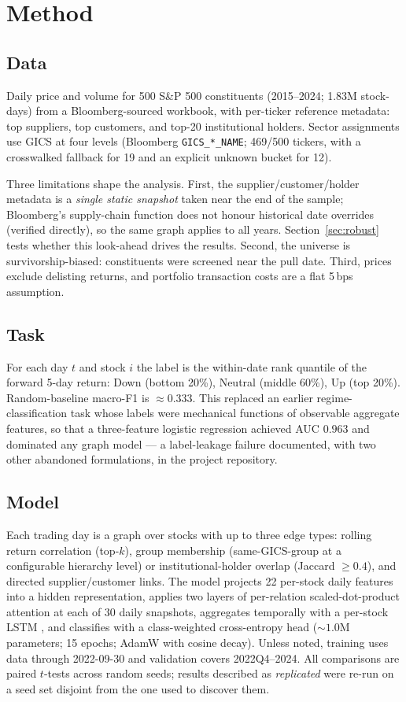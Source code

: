 \documentclass[11pt]{airesearch}
\begin{document}
\section{Method}

\subsection{Data}
Daily price and volume for 500 S\&P 500 constituents (2015--2024; 1.83M
stock-days) from a Bloomberg-sourced workbook, with per-ticker reference
metadata: top suppliers, top customers, and top-20 institutional holders.
Sector assignments use GICS at four levels (Bloomberg \texttt{GICS\_*\_NAME};
469/500 tickers, with a crosswalked fallback for 19 and an explicit unknown
bucket for 12).

Three limitations shape the analysis. First, the supplier/customer/holder
metadata is a \emph{single static snapshot} taken near the end of the sample;
Bloomberg's supply-chain function does not honour historical date overrides
(verified directly), so the same graph applies to all years.
Section~\ref{sec:robust} tests whether this look-ahead drives the results.
Second, the universe is survivorship-biased: constituents were screened near
the pull date. Third, prices exclude delisting returns, and portfolio
transaction costs are a flat 5\,bps assumption.

\subsection{Task}
For each day $t$ and stock $i$ the label is the within-date rank quantile of
the forward 5-day return: Down (bottom 20\%), Neutral (middle 60\%), Up (top
20\%). Random-baseline macro-F1 is ${\approx}0.333$. This replaced an earlier
regime-classification task whose labels were mechanical functions of
observable aggregate features, so that a three-feature logistic regression
achieved AUC $0.963$ and dominated any graph model --- a label-leakage failure
documented, with two other abandoned formulations, in the project repository.

\subsection{Model}
Each trading day is a graph over stocks with up to three edge types: rolling
return correlation (top-$k$), group membership (same-GICS-group at a
configurable hierarchy level) or institutional-holder overlap (Jaccard
$\geq 0.4$), and directed supplier/customer links. The model projects 22
per-stock daily features into a hidden representation, applies two layers of
per-relation scaled-dot-product attention \citep{vaswani2017attention,
velickovic2018graph} at each of 30 daily snapshots, aggregates temporally with
a per-stock LSTM \citep{hochreiter1997long}, and classifies with a
class-weighted cross-entropy head (${\sim}1.0$M parameters; 15 epochs; AdamW
with cosine decay). Unless noted, training uses data through 2022-09-30 and
validation covers 2022Q4--2024. All comparisons are paired $t$-tests across
random seeds; results described as \emph{replicated} were re-run on a seed set
disjoint from the one used to discover them.
\end{document}
